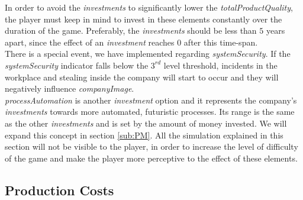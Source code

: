\begin{figure}[ht]
\centering
{}
	\label{fig:InvestmentGraph}
\end{figure}


In order to avoid the \textit{investments} to significantly lower the \textit{totalProductQuality}, the player must keep in mind to invest in these elements constantly over the duration of the game. Preferably, the \textit{investments} should be less than $5$ years apart, since the effect of an \textit{investment} reaches $0$ after this time-span.\\
There is a special event, we have implemented regarding \textit{systemSecurity}.
If the \textit{systemSecurity} indicator falls below the $3^{rd}$ level threshold, incidents in the workplace and stealing inside the company will start to occur and they will negatively influence \textit{companyImage}. \\
\textit{processAutomation} is another \textit{investment} option and it represents the company's \textit{investments} towards more automated, futuristic processes. Its range is the same as the other \textit{investments} and is set by the amount of money invested. We will expand this concept in section \ref{sub:PM}.
All the simulation explained in this section will not be visible to the player, in order to increase the level of difficulty of the game and make the player more perceptive to the effect of these elements. 


\subsection{Production Costs}
\label{prodCosts_simulation}

